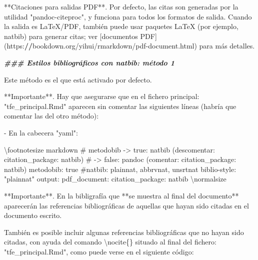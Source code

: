 \documentclass[11pt,a4paper,oneside,]{article}
\newenvironment{Shaded}{\begin{snugshade}}{\end{snugshade}}
\newcommand{\AttributeTok}[1]{\textcolor[rgb]{0.77,0.63,0.00}{#1}}
\newcommand{\DocumentationTok}[1]{\textcolor[rgb]{0.56,0.35,0.01}{\textbf{\textit{#1}}}}
\newcommand{\ErrorTok}[1]{\textcolor[rgb]{0.64,0.00,0.00}{\textbf{#1}}}
\newcommand{\FunctionTok}[1]{\textcolor[rgb]{0.00,0.00,0.00}{#1}}
\newcommand{\NormalTok}[1]{#1}
\newcommand{\SpecialCharTok}[1]{\textcolor[rgb]{0.00,0.00,0.00}{#1}}
\newcommand{\StringTok}[1]{\textcolor[rgb]{0.31,0.60,0.02}{#1}}
\numberwithin{dummy}{section}
\theoremstyle{ocrenumbox}
\theoremstyle{blacknumex}
\theoremstyle{blacknumbox}
\theoremstyle{ocrenum}
\theoremstyle{ocrenum}
\begin{document}
\begin{Shaded}
\begin{Highlighting}[numbers=left,,firstnumber=1101,]
\SpecialCharTok{**}\NormalTok{Citaciones para salidas PDF}\SpecialCharTok{**}\NormalTok{. Por defecto, las citas son generadas por la utilidad }\StringTok{"pandoc{-}citeproc"}\NormalTok{, y funciona para todos los formatos de salida. Cuando la salida es LaTeX}\SpecialCharTok{/}\NormalTok{PDF, también puede usar paquetes }\FunctionTok{LaTeX}\NormalTok{ (por ejemplo, natbib) para generar citas; ver [documentos PDF](https}\SpecialCharTok{:}\ErrorTok{//}\NormalTok{bookdown.org}\SpecialCharTok{/}\NormalTok{yihui}\SpecialCharTok{/}\NormalTok{rmarkdown}\SpecialCharTok{/}\NormalTok{pdf}\SpecialCharTok{{-}}\NormalTok{document.html) para más detalles.}






\DocumentationTok{\#\#\# Estilos bibliográficos con natbib: método 1}

\NormalTok{Este método es el que está activado por defecto.}

\SpecialCharTok{**}\NormalTok{Importante}\SpecialCharTok{**}\NormalTok{. Hay que asegurarse que en el fichero principal}\SpecialCharTok{:} \StringTok{"tfe\_principal.Rmd"}\NormalTok{ aparecen sin comentar las siguientes líneas (habría que comentar las del otro método)}\SpecialCharTok{:}

\SpecialCharTok{{-}}\NormalTok{ En la cabecera }\StringTok{"yaml"}\SpecialCharTok{:}

\NormalTok{\textbackslash{}footnotesize}
\StringTok{\textasciigrave{}\textasciigrave{}\textasciigrave{}}\AttributeTok{markdown}
\AttributeTok{\# metodobib {-}\textgreater{} true: natbib (descomentar: citation\_package: natbib) }
\AttributeTok{\#           {-}\textgreater{} false: pandoc (comentar: citation\_package: natbib)}
\AttributeTok{metodobib: true}
\AttributeTok{\#natbib: plainnat, abbrvnat, unsrtnat}
\AttributeTok{biblio{-}style: "plainnat"}
\AttributeTok{output: }
\AttributeTok{  pdf\_document: }
\AttributeTok{    citation\_package: natbib}
\StringTok{\textasciigrave{}\textasciigrave{}\textasciigrave{}}
\NormalTok{\textbackslash{}normalsize}






\SpecialCharTok{**}\NormalTok{Importante}\SpecialCharTok{**}\NormalTok{. En la bibligrafía  que }\SpecialCharTok{**}\NormalTok{se muestra al final del documento}\SpecialCharTok{**}\NormalTok{  aparecerán las referencias bibliográficas de aquellas que hayan sido citadas en el documento escrito.}

\NormalTok{También es posible incluir algunas referencias bibliográficas que no hayan sido citadas, con ayuda del comando }\StringTok{\textasciigrave{}}\SpecialCharTok{\textbackslash{}n}\AttributeTok{ocite\{\}}\StringTok{\textasciigrave{}}\NormalTok{ situado al final del fichero}\SpecialCharTok{:} \StringTok{"tfe\_principal.Rmd"}\NormalTok{, como puede verse en el siguiente código}\SpecialCharTok{:}


\end{Highlighting}
\end{Shaded}
\end{document}

